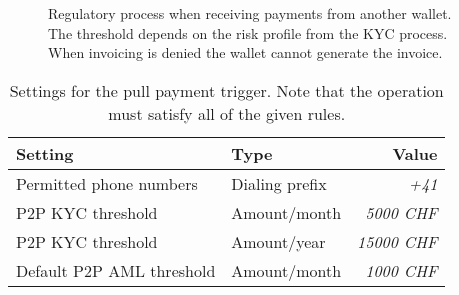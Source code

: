 \begin{figure}[h!]
\begin{center}
  \end{center}
  \caption{Regulatory process when receiving payments from another wallet.
    The threshold depends on the risk profile from the KYC process.
    When invoicing is denied the wallet cannot generate the invoice.}
\end{figure}


\begin{table}[h!]
  \caption{Settings for the pull payment trigger. Note that the operation
  must satisfy all of the given rules.}
  \begin{tabular}{l|l|r}
    {\bf Setting}             & {\bf Type}      & {\bf Value} \\ \hline \hline
    Permitted phone numbers   & Dialing prefix  & {\em +41} \\
    P2P KYC threshold         & Amount/month    & {\em  5000 CHF} \\
    P2P KYC threshold         & Amount/year     & {\em 15000 CHF} \\
    Default P2P AML threshold & Amount/month    & {\em  1000 CHF} \\
  \end{tabular}
\end{table}
